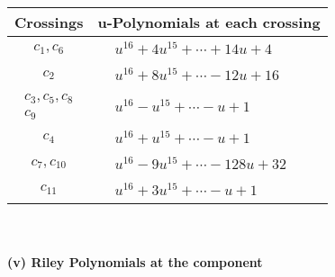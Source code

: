 \documentclass[1p]{elsarticle_modified}
\theoremstyle{definition}
\begin{document}
\begin{tabular}{m{50pt}|m{274pt}}
Crossings & \hspace{64pt}u-Polynomials at each crossing \\
\hline $$\begin{aligned}c_{1},c_{6}\end{aligned}$$&$\begin{aligned}
&u^{16}+4 u^{15}+\cdots+14 u+4
\end{aligned}$\\
\hline $$\begin{aligned}c_{2}\end{aligned}$$&$\begin{aligned}
&u^{16}+8 u^{15}+\cdots-12 u+16
\end{aligned}$\\
\hline $$\begin{aligned}c_{3},c_{5},c_{8}\\c_{9}\end{aligned}$$&$\begin{aligned}
&u^{16}- u^{15}+\cdots- u+1
\end{aligned}$\\
\hline $$\begin{aligned}c_{4}\end{aligned}$$&$\begin{aligned}
&u^{16}+u^{15}+\cdots- u+1
\end{aligned}$\\
\hline $$\begin{aligned}c_{7},c_{10}\end{aligned}$$&$\begin{aligned}
&u^{16}-9 u^{15}+\cdots-128 u+32
\end{aligned}$\\
\hline $$\begin{aligned}c_{11}\end{aligned}$$&$\begin{aligned}
&u^{16}+3 u^{15}+\cdots- u+1
\end{aligned}$\\
\hline
\end{tabular}\\~\\
\newpage\renewcommand{\arraystretch}{1}
\flushleft \textbf{(v) Riley Polynomials at the component}\newline \\
\end{document}
